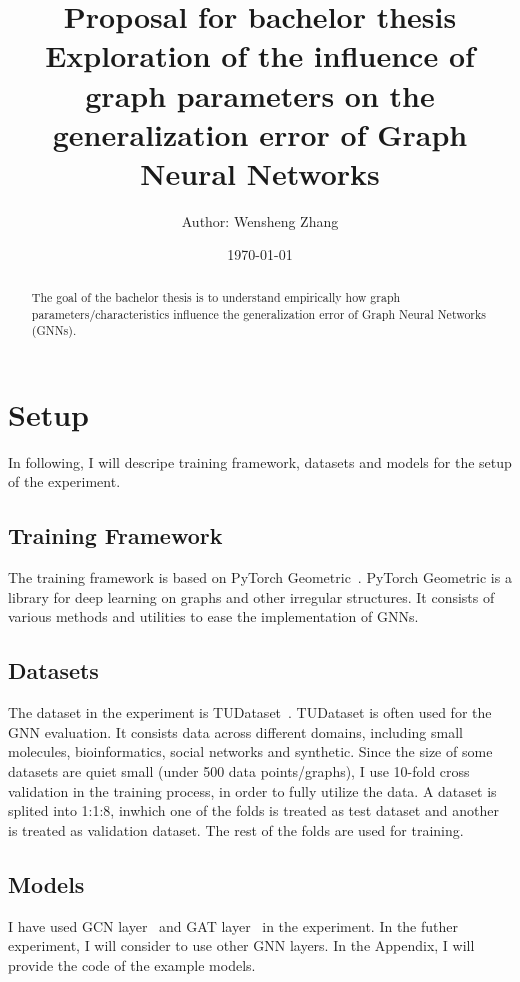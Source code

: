 \documentclass{article}
\title{\textbf{Proposal for bachelor thesis}\\
Exploration of the influence of graph parameters on the generalization error of Graph Neural Networks}
\author{Author: Wensheng Zhang}
\date{\today}
\begin{document}
 

\maketitle

\tableofcontents


\begin{abstract}
The goal of the bachelor thesis is to understand empirically how graph parameters/characteristics influence the generalization error of Graph Neural Networks (GNNs).
\end{abstract}


\section{Setup}
In following, I will descripe training framework, datasets and models for the setup of the experiment.

\subsection{Training Framework}
The training framework is based on PyTorch Geometric~\cite{fey2019fast}. PyTorch Geometric is a library for deep learning on graphs and other irregular structures. It consists of various methods and utilities to ease the implementation of GNNs.

\subsection{Datasets}
The dataset in the experiment is TUDataset~\cite{morris_tudataset_2020}. TUDataset is often used for the GNN evaluation. It consists data across different domains, including small molecules, bioinformatics, social networks and synthetic. Since the size of some datasets are quiet small (under 500 data points/graphs), I use 10-fold cross validation in the training process, in order to fully utilize the data. A dataset is splited into 1:1:8, inwhich one of the folds is treated as test dataset and another is treated as validation dataset. The rest of the folds are used for training. 

\subsection{Models}
I have used GCN layer~\cite{kipf2017semisupervised} and GAT layer~\cite{velickovic2020pointer} in the experiment. In the futher experiment, I will consider to use other GNN layers. In the Appendix, I will provide the code of the example models.
\end{document}
